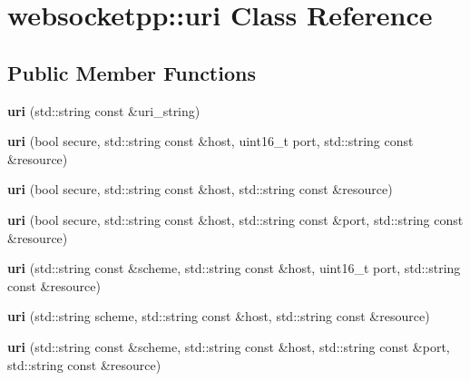 \hypertarget{classwebsocketpp_1_1uri}{}\section{websocketpp\+:\+:uri Class Reference}
\label{classwebsocketpp_1_1uri}
\subsection*{Public Member Functions}
\begin{DoxyCompactItemize}
\item 
\mbox{\label{classwebsocketpp_1_1uri_a8cb22ae92e3e49c4351a3f873a9b279d}} 
{\bfseries uri} (std\+::string const \&uri\+\_\+string)
\item 
\mbox{\label{classwebsocketpp_1_1uri_a3c133d45cf2ebb1859e7113b2b9d44b3}} 
{\bfseries uri} (bool secure, std\+::string const \&host, uint16\+\_\+t port, std\+::string const \&resource)
\item 
\mbox{\label{classwebsocketpp_1_1uri_ae7bfd18657c73695a4ff58318e02066a}} 
{\bfseries uri} (bool secure, std\+::string const \&host, std\+::string const \&resource)
\item 
\mbox{\label{classwebsocketpp_1_1uri_a0d1197614a15afedca9fdfd1bfef3d85}} 
{\bfseries uri} (bool secure, std\+::string const \&host, std\+::string const \&port, std\+::string const \&resource)
\item 
\mbox{\label{classwebsocketpp_1_1uri_a9019b4a2e3de42a822f2e37baa332c9e}} 
{\bfseries uri} (std\+::string const \&scheme, std\+::string const \&host, uint16\+\_\+t port, std\+::string const \&resource)
\item 
\mbox{\label{classwebsocketpp_1_1uri_a2cf8998d357854ed3ce5fd8cb38742a5}} 
{\bfseries uri} (std\+::string scheme, std\+::string const \&host, std\+::string const \&resource)
\item 
\mbox{\label{classwebsocketpp_1_1uri_a162349184bbc29a4d30f6fc50969e6e6}} 
{\bfseries uri} (std\+::string const \&scheme, std\+::string const \&host, std\+::string const \&port, std\+::string const \&resource)

\end{DoxyCompactItemize}
